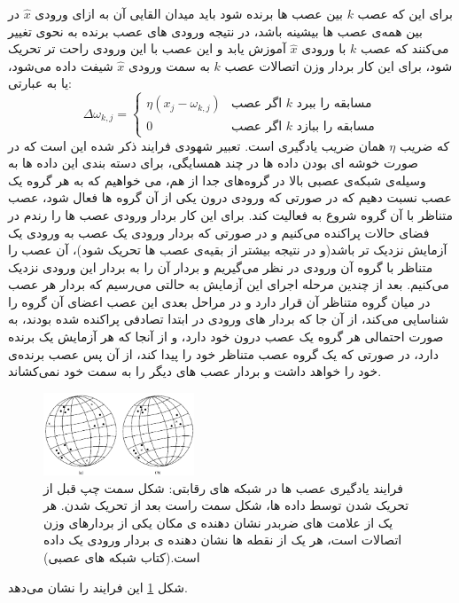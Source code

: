 \documentclass[11pt,a4paper,twocolumn]{article}
\begin{document}
برای این که عصب $k$ بین عصب ها برنده شود باید میدان القایی آن به ازای ورودی $\widehat x$ در بین همه‌ی عصب ها بیشینه باشد، در نتیجه ورودی های عصب برنده به نحوی تغییر می‌کنند که عصب  $k$ با ورودی $\widehat x$ آموزش یابد و این عصب با این ورودی راحت تر تحریک شود، برای این کار بردار وزن اتصالات عصب $k$ به سمت ورودی $\widehat x$ شیفت داده می‌شود، یا به عبارتی:
$$\Delta \omega_{k,j}= \begin{cases} \eta(x_j-\omega_{k,j}) & \text{اگر عصب $k$ مسابقه را ببرد} \\ 0 & \text{اگر عصب $k$ مسابقه را ببازد}  \end{cases}$$
که ضریب $\eta$ همان ضریب یادگیری است. تعبیر شهودی فرایند ذکر شده این است که در صورت خوشه ای بودن داده ها در چند همسایگی، برای دسته بندی این داده ها به وسیله‌ی شبکه‌ی عصبی بالا در گروه‌های جدا از هم، می خواهیم که به هر گروه یک عصب نسبت دهیم که در صورتی که ورودی درون یکی از آن گروه ها فعال شود، عصب متناظر با آن گروه شروع به فعالیت کند. برای این کار بردار ورودی عصب ها را رندم در فضای حالات پراکنده می‌کنیم و در صورتی که بردار ورودی یک عصب به ورودی یک آزمایش نزدیک تر باشد(و در نتیجه بیشتر از بقیه‌ی عصب ها تحریک شود)، آن عصب را متناظر با گروه آن ورودی در نظر می‌گیریم و بردار آن را به بردار این ورودی نزدیک می‌کنیم. بعد از چندین مرحله اجرای این آزمایش به حالتی می‌رسیم که بردار هر عصب در میان گروه متناظر آن قرار دارد و در مراحل بعدی این عصب اعضای آن گروه را شناسایی می‌کند، از آن جا که بردار های ورودی در ابتدا تصادفی پراکنده شده بودند، به صورت احتمالی هر گروه یک عصب درون خود دارد، و از آنجا که هر آزمایش یک برنده دارد، در صورتی که یک گروه عصب متناظر خود را پیدا کند، از آن پس عصب برنده‌ی خود را خواهد داشت و بردار عصب های دیگر را به سمت خود نمی‌کشاند.



\begin{figure}
  \centering
    \includegraphics[width=0.4\textwidth]{competitive.png}
  \caption{فرایند یادگیری عصب ها در شبکه های رقابتی: شکل سمت چپ قبل از تحریک شدن توسط داده ها، شکل سمت راست بعد از تحریک شدن. هر یک از علامت های ضربدر نشان دهنده ی مکان یکی از بردارهای وزن اتصالات است، هر یک از نقطه ها نشان دهنده ی بردار ورودی یک داده است.(کتاب شبکه های عصبی\cite[ص-60]{haykin})}
  \label{fig:competitive}
\end{figure}
شکل \ref{fig:competitive} این فرایند را نشان می‌دهد.
\end{document}
